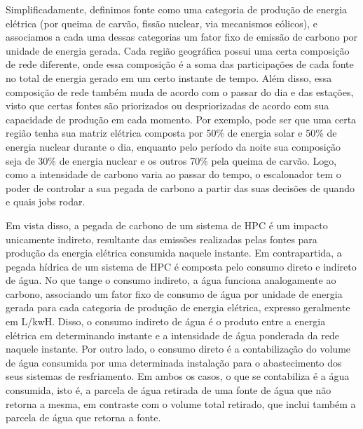 Simplificadamente, definimos fonte como uma categoria de produção de energia elétrica (por queima de carvão, fissão nuclear, 
via mecanismos eólicos), e associamos a cada uma dessas categorias um fator fixo de emissão de carbono por unidade de
energia gerada. Cada região geográfica possui uma certa composição de rede diferente, onde essa composição é a soma
das participações de cada fonte no total de energia gerado em um certo instante de tempo. Além disso, essa composição de rede
também muda de acordo com o passar do dia e das estações, visto que certas fontes são priorizados ou despriorizadas 
de acordo com sua capacidade de produção em cada momento. Por exemplo, pode ser que uma certa região tenha sua matriz elétrica composta por 50\% de energia solar
e 50\% de energia nuclear durante o dia, enquanto pelo período da noite sua composição seja de 30\% de energia nuclear
e os outros 70\% pela queima de carvão. Logo, como a intensidade de carbono varia ao passar do tempo, o escalonador
tem o poder de controlar a sua pegada de carbono a partir das suas decisões de quando e quais jobs rodar.

Em vista disso, a pegada de carbono de um sistema de HPC é um impacto unicamente indireto, resultante das emissões 
realizadas pelas fontes para produção da energia elétrica consumida naquele instante. Em contrapartida, 
a pegada hídrica de um sistema de HPC é composta pelo consumo direto e indireto de água. No que tange 
o consumo indireto, a água funciona analogamente ao carbono, associando um fator fixo de consumo de água 
por unidade de energia gerada para cada categoria de produção de energia elétrica, expresso geralmente em L/kwH. 
Disso, o consumo indireto de água é o produto entre a energia elétrica em determinando instante e a intensidade
de água ponderada da rede naquele instante. Por outro lado, o consumo direto é a contabilização do volume de água
consumida por uma determinada instalação para o abastecimento dos seus sistemas de resfriamento. Em ambos os casos,
o que se contabiliza é a água consumida, isto é, a parcela de água retirada de uma fonte de água que não retorna a mesma,
em contraste com o volume total retirado, que inclui também a parcela de água que retorna a fonte.

